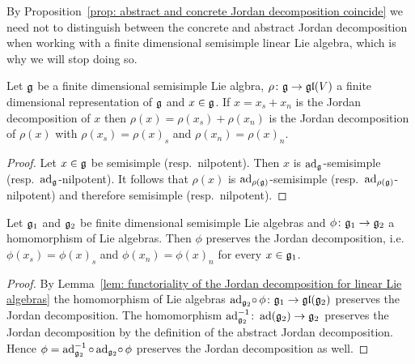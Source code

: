 \begin{remark}
 By Proposition~\ref{prop: abstract and concrete Jordan decomposition coincide} we need not to distinguish between the concrete and abstract Jordan decomposition when working with a finite dimensional semisimple linear Lie algebra, which is why we will stop doing so.
\end{remark}




\begin{lemma}\label{lem: functoriality of the Jordan decomposition for linear Lie algebras}
 Let $\mathfrak{g}$ be a finite dimensional semisimple Lie algbra, $\rho \colon \mathfrak{g} \to \mathfrak{gl}(V)$ a finite dimensional representation of $\mathfrak{g}$ and $x \in \mathfrak{g}$. If $x = x_s + x_n$ is the Jordan decomposition of $x$ then $\rho(x) = \rho(x_s) + \rho(x_n)$ is the Jordan decomposition of $\rho(x)$ with $\rho(x_s) = \rho(x)_s$ and $\rho(x_n) = \rho(x)_n$.
\end{lemma}
\begin{proof}
 Let $x \in \mathfrak{g}$ be semisimple (resp.\ nilpotent). Then $x$ is $\operatorname{ad}_{\mathfrak{g}}$-semisimple (resp.\ $\operatorname{ad}_{\mathfrak{g}}$-nilpotent). It follows that $\rho(x)$ is $\operatorname{ad}_{\rho(\mathfrak{g})}$-semisimple (resp.\ $\operatorname{ad}_{\rho(\mathfrak{g})}$-nilpotent) and therefore semisimple (resp.\ nilpotent).
\end{proof}


\begin{corollary} \label{cor: functoriality of the Jordan decomposition}
 Let $\mathfrak{g}_1$ and $\mathfrak{g}_2$ be finite dimensional semisimple Lie algebras and $\phi \colon \mathfrak{g}_1 \to \mathfrak{g}_2$ a homomorphism of Lie algebras. Then $\phi$ preserves the Jordan decomposition, i.e.\ $\phi(x_s) = \phi(x)_s$ and $\phi(x_n) = \phi(x)_n$ for every $x \in \mathfrak{g}_1$.
\end{corollary}
\begin{proof}
 By Lemma~\ref{lem: functoriality of the Jordan decomposition for linear Lie algebras} the homomorphism of Lie algebras $\operatorname{ad}_{\mathfrak{g}_2} \!\circ\, \phi \colon \mathfrak{g}_1 \to \mathfrak{gl}(\mathfrak{g}_2)$ preserves the Jordan decomposition. The homomorphism $\operatorname{ad}_{\mathfrak{g}_2}^{-1} \colon \operatorname{ad}(\mathfrak{g}_2) \to \mathfrak{g}_2$ preserves the Jordan decomposition by the definition of the abstract Jordan decomposition. Hence $\phi = \operatorname{ad}_{\mathfrak{g}_2}^{-1} \circ \operatorname{ad}_{\mathfrak{g}_2}\! \circ\, \phi$ preserves the Jordan decomposition as well.
\end{proof}






















